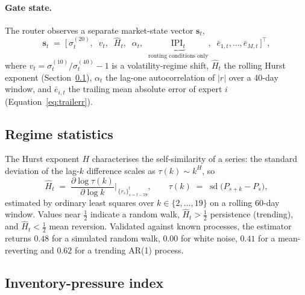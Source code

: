 \paragraph{Gate state.} The router observes a separate market-state vector
$\bm{s}_t$,
\begin{equation}
\bm{s}_t \;=\;
\Big[\, \sigma^{(20)}_t,\;\;
v_t,\;\;
\widehat{H}_t,\;\;
\alpha_t,\;\;
\underbrace{\mathrm{IPI}_t}_{\text{routing conditions only}},\;\;
\bar{e}_{1,t},\dots,\bar{e}_{M,t} \,\Big]^{\!\top},
\end{equation}
where $v_t = \sigma^{(10)}_t / \sigma^{(40)}_t - 1$ is a volatility-regime shift,
$\widehat{H}_t$ the rolling Hurst exponent (Section~\ref{sec:hurst}),
$\alpha_t$ the lag-one autocorrelation of $\lvert r\rvert$ over a 40-day window,
and $\bar{e}_{i,t}$ the trailing mean absolute error of expert $i$
(Equation~\ref{eq:trailerr}).

\subsection{Regime statistics}
\label{sec:hurst}

The Hurst exponent $H$ characterises the self-similarity of a series: the standard
deviation of the lag-$k$ difference scales as $\tau(k)\sim k^{H}$, so
\begin{equation}
\widehat{H}_t \;=\;
\frac{\partial \log \tau(k)}{\partial \log k}\bigg|_{\,\{r_s\}_{s=t-59}^{t}},
\qquad
\tau(k) \;=\; \operatorname{sd}\!\big(P_{s+k}-P_{s}\big),
\end{equation}
estimated by ordinary least squares over $k \in \{2,\dots,19\}$ on a rolling
60-day window. Values near $\tfrac12$ indicate a random walk, $\widehat{H}_t>\tfrac12$
persistence (trending), and $\widehat{H}_t<\tfrac12$ mean reversion. Validated
against known processes, the estimator returns $0.48$ for a simulated random walk,
$0.00$ for white noise, $0.41$ for a mean-reverting and $0.62$ for a trending
AR(1) process.

\subsection{Inventory-pressure index}

